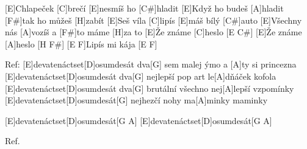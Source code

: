 

[E]Chlapeček [C]brečí [E]nesmíš ho [C#]hladit
[E]Když ho budeš [A]hladit [F#]tak ho můžeš [H]zabít
[E]Seš víla [C]lipís [E]máš bílý [C#]auto
[E]Všechny nás [A]vozíš a [F#]to máme [H]za to
[E]\null Že známe [C]heslo [E C#]
[E]\null Že známe [A]heslo [H F#]
[E F]Lipís mi kája [E F]

Ref:
[E]devatenáctset[D]osumdesát dva[G] sem malej ýmo a [A]ty si princezna
[E]devatenáctset[D]osumdesát dva[G] nejlepší pop art le[A]dňáček kofola
[E]devatenáctset[D]osumdesát dva[G] brutální všechno nej[A]lepší vzpomínky
[E]devatenáctset[D]osumdesát[G] nejhezčí nohy ma[A]minky maminky

[E]devatenáctset[D]osumdesát[G A]
[E]devatenáctset[D]osumdesát[G A]

Ref.